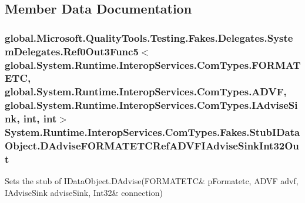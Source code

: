 \subsection{Member Data Documentation}
\hypertarget{class_system_1_1_runtime_1_1_interop_services_1_1_com_types_1_1_fakes_1_1_stub_i_data_object_a64d717ebe75e5eb2a2b469bf6dd5d526}{
\subsubsection[{D\-Advise\-F\-O\-R\-M\-A\-T\-E\-T\-C\-Ref\-A\-D\-V\-F\-I\-Advise\-Sink\-Int32\-Out}]{\setlength{\rightskip}{0pt plus 5cm}global.\-Microsoft.\-Quality\-Tools.\-Testing.\-Fakes.\-Delegates.\-System\-Delegates.\-Ref0\-Out3\-Func5$<$global.\-System.\-Runtime.\-Interop\-Services.\-Com\-Types.\-F\-O\-R\-M\-A\-T\-E\-T\-C, global.\-System.\-Runtime.\-Interop\-Services.\-Com\-Types.\-A\-D\-V\-F, global.\-System.\-Runtime.\-Interop\-Services.\-Com\-Types.\-I\-Advise\-Sink, int, int$>$ System.\-Runtime.\-Interop\-Services.\-Com\-Types.\-Fakes.\-Stub\-I\-Data\-Object.\-D\-Advise\-F\-O\-R\-M\-A\-T\-E\-T\-C\-Ref\-A\-D\-V\-F\-I\-Advise\-Sink\-Int32\-Out}}\label{class_system_1_1_runtime_1_1_interop_services_1_1_com_types_1_1_fakes_1_1_stub_i_data_object_a64d717ebe75e5eb2a2b469bf6dd5d526}


Sets the stub of I\-Data\-Object.\-D\-Advise(F\-O\-R\-M\-A\-T\-E\-T\-C\& p\-Formatetc, A\-D\-V\-F advf, I\-Advise\-Sink advise\-Sink, Int32\& connection)

